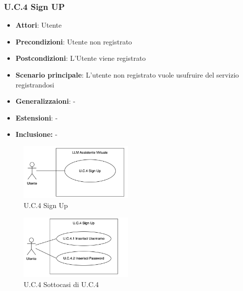 \subsubsection{U.C.4 Sign UP}
\begin{itemize}
    \item \textbf{Attori}: Utente
    \item \textbf{Precondizioni}: Utente non registrato
    \item \textbf{Postcondizioni}: L'Utente viene registrato
    \item \textbf{Scenario principale}: L’utente non registrato vuole usufruire del servizio registrandosi
    \item \textbf{Generalizzaioni}: -
    \item \textbf{Estensioni}: -
    \item \textbf{Inclusione:} -
\end{itemize}
\begin{figure}[h!]
    \centering
    \includegraphics[width=0.5\textwidth]{img/UC4.png}
    \caption{U.C.4 Sign Up}
\end{figure}
\begin{figure}[h!]
    \centering
    \includegraphics[width=0.5\textwidth]{img/UC4p1.png}
    \caption{U.C.4 Sottocasi di U.C.4}
\end{figure}
\newpage

